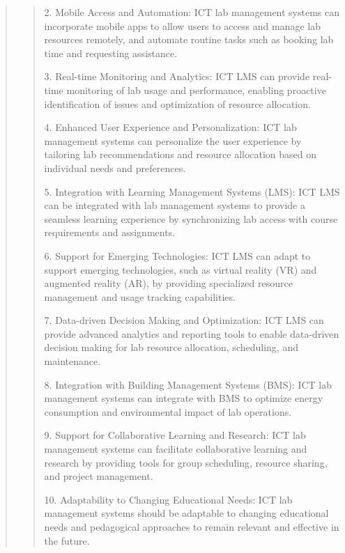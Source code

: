 \documentclass[12pt]{report}
\begin{document}
\begin{quote}
\begin{quote}
			2. Mobile Access and Automation: ICT lab management systems can incorporate mobile apps to allow users to access and manage lab resources remotely, and automate routine tasks such as booking lab time and requesting assistance.
			
			3. Real-time Monitoring and Analytics: ICT LMS can provide real-time monitoring of lab usage and performance, enabling proactive identification of issues and optimization of resource allocation.
			
			4. Enhanced User Experience and Personalization: ICT lab management systems can personalize the user experience by tailoring lab recommendations and resource allocation based on individual needs and preferences.
			
			5. Integration with Learning Management Systems (LMS): ICT LMS can be integrated with lab management systems to provide a seamless learning experience by synchronizing lab access with course requirements and assignments.
			
			6. Support for Emerging Technologies: ICT LMS can adapt to support emerging technologies, such as virtual reality (VR) and augmented reality (AR), by providing specialized resource management and usage tracking capabilities.
			
			7. Data-driven Decision Making and Optimization: ICT LMS can provide advanced analytics and reporting tools to enable data-driven decision making for lab resource allocation, scheduling, and maintenance.
			
			8. Integration with Building Management Systems (BMS): ICT lab management systems can integrate with BMS to optimize energy consumption and environmental impact of lab operations.
			
			9. Support for Collaborative Learning and Research: ICT lab management systems can facilitate collaborative learning and research by providing tools for group scheduling, resource sharing, and project management.
			
			10. Adaptability to Changing Educational Needs: ICT lab management systems should be adaptable to changing educational needs and pedagogical approaches to remain relevant and effective in the future.
		\end{quote}
		
	\end{quote}
	\clearpage
	
\end{document}
